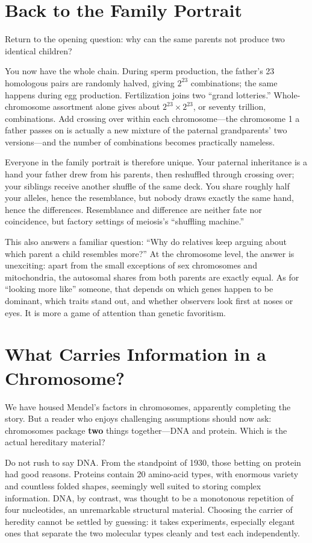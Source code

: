\section{Back to the Family Portrait}

Return to the opening question: why can the same parents not produce two identical children?

You now have the whole chain. During sperm production, the father's 23 homologous pairs are randomly halved, giving $2^{23}$ combinations; the same happens during egg production. Fertilization joins two ``grand lotteries.'' Whole-chromosome assortment alone gives about $2^{23} \times 2^{23}$, or seventy trillion, combinations. Add crossing over within each chromosome---the chromosome 1 a father passes on is actually a new mixture of the paternal grandparents' two versions---and the number of combinations becomes practically nameless.

Everyone in the family portrait is therefore unique. Your paternal inheritance is a hand your father drew from his parents, then reshuffled through crossing over; your siblings receive another shuffle of the same deck. You share roughly half your alleles, hence the resemblance, but nobody draws exactly the same hand, hence the differences. Resemblance and difference are neither fate nor coincidence, but factory settings of meiosis's ``shuffling machine.''

This also answers a familiar question: ``Why do relatives keep arguing about which parent a child resembles more?'' At the chromosome level, the answer is unexciting: apart from the small exceptions of sex chromosomes and mitochondria, the autosomal shares from both parents are exactly equal. As for ``looking more like'' someone, that depends on which genes happen to be dominant, which traits stand out, and whether observers look first at noses or eyes. It is more a game of attention than genetic favoritism.

\section{What Carries Information in a Chromosome?}

We have housed Mendel's factors in chromosomes, apparently completing the story. But a reader who enjoys challenging assumptions should now ask: chromosomes package \textbf{two} things together---DNA and protein. Which is the actual hereditary material?

Do not rush to say DNA. From the standpoint of 1930, those betting on protein had good reasons. Proteins contain 20 amino-acid types, with enormous variety and countless folded shapes, seemingly well suited to storing complex information. DNA, by contrast, was thought to be a monotonous repetition of four nucleotides, an unremarkable structural material. Choosing the carrier of heredity cannot be settled by guessing: it takes experiments, especially elegant ones that separate the two molecular types cleanly and test each independently.

